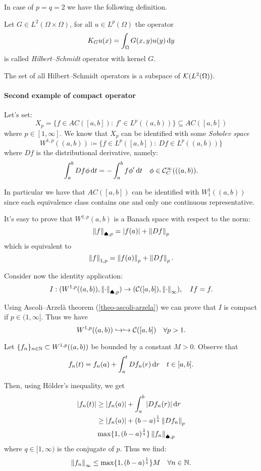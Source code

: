 In case of $p=q=2$ we have the following definition.

\begin{defn}
	Let $G \in L^2(\Omega \times \Omega)$, for all $u \in L^p(\Omega)$ the operator
	$$K_G u(x) = \int_\Omega G(x,y) u(y) \,\mathrm d y$$
	is called \emph{Hilbert--Schmidt} operator with kernel $G$.
	
	The set of all Hilbert--Schmidt operators is a subspace of $\mathcal K(L^2(\Omega))$.
\end{defn}

\paragraph{Second example of compact operator}
Let's set: 
$$X_p = \{f \in AC([a,b]): \ f' \in L^p((a,b))\} 
\subseteq AC([a,b])$$
where $p \in [1,\infty]$. We know that $X_p$ can be identified with some \textit{Sobolev space}
$$W^{1,p}((a,b)) \coloneqq \{f \in L^p([a,b]) : \ Df \in L^p ((a,b))  \}$$
where $Df$ is the distributional derivative, namely:
$$\int_a^b Df \phi \, \mathrm d t =
-\int_a^b f \phi' \, \mathrm d t
\quad \phi \in \mathcal C_C^\infty(((a,b)).$$

In particular we have that $AC([a,b])$ can be identified with $W_1^1((a,b))$ since each equivalence class contains one and only one continuous representative.

It's easy to prove that $W^{1,p}(a,b)$ is a Banach space with respect to the norm:
$$\left\lVert f\right\rVert_{\spadesuit, p} = |f(a)| + \left\lVert Df\right\rVert_p$$
which is equivalent to 
$$\left\lVert f\right\rVert_{1, p} = \left\lVert f(a)\right\rVert_{p} + \left\lVert Df\right\rVert_p.$$

Consider now the identity application:
$$I: (W^{1,p}((a,b)), \left\lVert\cdot\right\rVert_{\spadesuit, p}) \to (\mathcal C([a,b]), \left\lVert\cdot\right\rVert_\infty), \quad I f=f.$$

Using Ascoli--Arzelà theorem (\vref{theo-ascoli-arzela}) we can prove that $I$ is compact if $p \in (1,\infty]$.
Thus we have
$$W^{1,p} ((a,b)) \hookrightarrow \hookrightarrow \mathcal C([a,b]) \quad \forall p > 1.$$

Let $\{f_n\}_{n \in \mathbb N} \subset W^{1,p}((a,b))$ be bounded by a constant $M > 0$.
Observe that
$$f_n(t)= f_n(a) + \int_a^t Df_n(r) \, \mathrm d r \quad t \in [a,b].$$

Then, using Hölder's inequality, we get
\begin{align*}
	|f_n(t)| & \geq |f_n(a)| + \int_a^b |Df_n(r)| \, \mathrm d r \\
	& \geq |f_n(a)| + (b - a)^{\frac 1 q} \left\lVert Df_n\right\rVert_p\\
	& \max\{1, (b-a)^{\frac 1 q} \}\left\lVert f_n\right\rVert_{\spadesuit,p}
\end{align*}
where $q \in [1, \infty)$ is the conjugate of $p$. Thus we find:
$$\left\lVert f_n\right\rVert_\infty \leq \max \{1, (b-a)^{\frac 1 q}\}M \quad \forall n \in \mathbb N.$$

